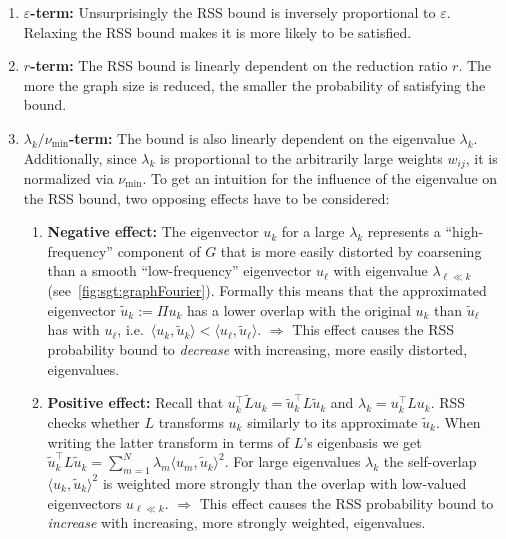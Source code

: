 \begin{enumerate}[label=\textbf{\arabic*.}]
	\item \textbf{$\varepsilon$-term:}
		Unsurprisingly the RSS bound is inversely proportional to $\varepsilon$.
		Relaxing the RSS bound makes it is more likely to be satisfied.
	\item \textbf{$r$-term:}
		The RSS bound is linearly dependent on the reduction ratio $r$.
		The more the graph size is reduced, the smaller the probability of satisfying the bound.
	\item \textbf{$\lambda_k / \nu_{\text{min}}$-term:}
		The bound is also linearly dependent on the eigenvalue $\lambda_k$.
		Additionally, since $\lambda_k$ is proportional to the arbitrarily large weights $w_{i j}$, it is normalized via $\nu_{\text{min}}$.
		To get an intuition for the influence of the eigenvalue on the RSS bound, two opposing effects have to be considered:
		\begin{enumerate}[label=(\roman*)] %
			\item \textbf{Negative effect:}\label{itm:cons:bound:neg}
				The eigenvector $u_k$ for a large $\lambda_k$ represents a ``high-frequency'' component of $G$ that is more easily distorted by coarsening than a smooth ``low-frequency'' eigenvector $u_\ell$ with eigenvalue $\lambda_{\ell \ll k}$ (see~\cref{fig:sgt:graphFourier}).
				Formally this means that the approximated eigenvector $\widetilde{u}_k := \Pi u_k$ has a lower overlap with the original $u_k$ than $\widetilde{u}_\ell$ has with $u_\ell$, i.e.\ $\langle u_k, \widetilde{u}_k \rangle < \langle u_\ell, \widetilde{u}_\ell \rangle$.
				$\pmb{\Rightarrow}$ This effect causes the RSS probability bound to \textit{decrease} with increasing, more easily distorted, eigenvalues.
			\item \textbf{Positive effect:}\label{itm:cons:bound:pos}
				Recall that $u_k^\top \widetilde{L} u_k = \widetilde{u}_k^\top L \widetilde{u}_k$ and $\lambda_k = u_k^\top L u_k$.
				RSS checks whether $L$ transforms $u_k$ similarly to its approximate $\widetilde{u}_k$.
				When writing the latter transform in terms of $L$'s eigenbasis we get $\widetilde{u}_k^\top L \widetilde{u}_k = \sum_{m = 1}^N \lambda_m \langle u_m, \widetilde{u}_k \rangle^2$.
				For large eigenvalues $\lambda_k$ the self-overlap $\langle u_k, \widetilde{u}_k \rangle^2$ is weighted more strongly than the overlap with low-valued eigenvectors $u_{\ell \ll k}$.
				$\pmb{\Rightarrow}$ This effect causes the RSS probability bound to \textit{increase} with increasing, more strongly weighted, eigenvalues.

\end{enumerate}
\end{enumerate}
